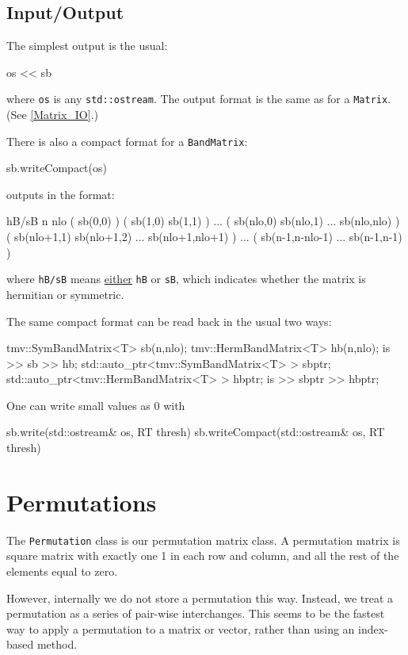 \documentclass[twoside,letterpaper,11pt]{article}
\renewcommand{\tt}[1]{{\lstinline {#1}}}
\begin{document}
\subsection{Input/Output}
\label{SymBandMatrix_IO}

The simplest output is the usual:
\begin{tmvcode}
os << sb
\end{tmvcode}
where \tt{os} is any \tt{std::ostream}.
The output format is the same as for a \tt{Matrix}.
(See \ref{Matrix_IO}.)

There is also a compact format for a \tt{BandMatrix}:
\begin{tmvcode}
sb.writeCompact(os)
\end{tmvcode}
outputs in the format:
\begin{tmvcode}
hB/sB n nlo
( sb(0,0)  )
( sb(1,0)  sb(1,1)  )
...
( sb(nlo,0)  sb(nlo,1) ...  sb(nlo,nlo) )
( sb(nlo+1,1)  sb(nlo+1,2) ...  sb(nlo+1,nlo+1) )
...
( sb(n-1,n-nlo-1)  ... sb(n-1,n-1) )
\end{tmvcode}
where \tt{hB/sB} means \underline{either} \tt{hB} or \tt{sB}, 
which indicates whether the matrix is hermitian or symmetric.

The same compact format can be read back in the usual two ways:
\begin{tmvcode}
tmv::SymBandMatrix<T> sb(n,nlo);
tmv::HermBandMatrix<T> hb(n,nlo);
is >> sb >> hb;
std::auto_ptr<tmv::SymBandMatrix<T> > sbptr;
std::auto_ptr<tmv::HermBandMatrix<T> > hbptr;
is >> sbptr >> hbptr;
\end{tmvcode}

One can write small values as 0 with
\begin{tmvcode}
sb.write(std::ostream& os, RT thresh)
sb.writeCompact(std::ostream& os, RT thresh)
\end{tmvcode}

\newpage
\section{Permutations}
\label{Permutation}

The \tt{Permutation} class is our permutation matrix class.
A permutation matrix is square matrix with exactly one 1 in each row and
column, and all the rest of the elements equal to zero.

However, internally we do not store a permutation this way.
Instead, we treat a permutation as a series of pair-wise interchanges.
This seems to be the fastest way to apply a permutation to a matrix or
vector, rather than using an index-based method.
\end{document}
